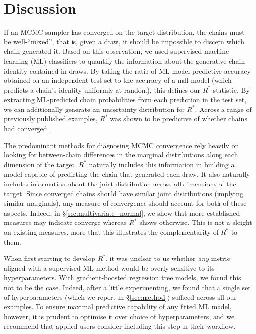 \documentclass{article}
\begin{document}
\section{Discussion}
If an MCMC sampler has converged on the target distribution, the chains must be well-``mixed'', that is, given a draw, it should be impossible to discern which chain generated it. Based on this observation, we used supervised machine learning (ML) classifiers to quantify the information about the generative chain identity contained in draws. By taking the ratio of ML model predictive accuracy obtained on an independent test set to the accuracy of a null model (which predicts a chain's identity uniformly at random), this defines our $R^*$ statistic. By extracting ML-predicted chain probabilities from each prediction in the test set, we can additionally generate an uncertainty distribution for $R^*$. Across a range of previously published examples, $R^*$ was shown to be predictive of whether chains had converged.

The predominant methods for diagnosing MCMC convergence rely heavily on looking for between-chain differences in the marginal distributions along each dimension of the target. $R^*$ naturally includes this information in building a model capable of predicting the chain that generated each draw. It also naturally includes information about the joint distribution across all dimensions of the target. Since converged chains should have similar joint distributions (implying similar marginals), any measure of convergence should account for both of these aspects. Indeed, in \S\ref{sec:multivariate_normal}, we show that more established measures may indicate converge whereas $R^*$ shows otherwise. This is not a sleight on existing measures, more that this illustrates the complementarity of $R^*$ to them.

When first starting to develop $R^*$, it was unclear to us whether \textit{any} metric aligned with a supervised ML method would be overly sensitive to its hyperparameters. With gradient-boosted regression tree models, we found this not to be the case. Indeed, after a little experimenting, we found that a single set of hyperparameters (which we report in \S\ref{sec:method}) sufficed across all our examples. To ensure maximal predictive capability of any fitted ML model, however, it is prudent to optimise it over choice of hyperparameters, and we recommend that applied users consider including this step in their workflow.
\end{document}
